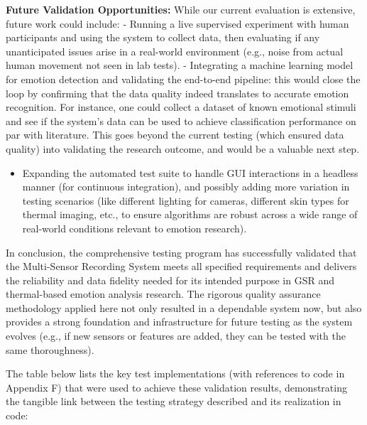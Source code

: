 {{\textbf{Future Validation Opportunities:} While our current evaluation is
extensive, future work could include: - Running a live supervised
experiment with human participants and using the system to collect data,
then evaluating if any unanticipated issues arise in a real-world
environment (e.g., noise from actual human movement not seen in lab
tests). - Integrating a machine learning model for emotion detection and
validating the end-to-end pipeline: this would close the loop by
confirming that the data quality indeed translates to accurate emotion
recognition. For instance, one could collect a dataset of known
emotional stimuli and see if the system's data can be used to achieve
classification performance on par with literature. This goes beyond the
current testing (which ensured data quality) into validating the
research outcome, and would be a valuable next step.

\begin{itemize}
\item Expanding the automated test suite to handle GUI interactions in a
  headless manner (for continuous integration), and possibly adding more
  variation in testing scenarios (like different lighting for cameras,
  different skin types for thermal imaging, etc., to ensure algorithms
  are robust across a wide range of real-world conditions relevant to
  emotion research).

\end{itemize}
In conclusion, the comprehensive testing program has successfully
validated that the Multi-Sensor Recording System meets all specified
requirements and delivers the reliability and data fidelity needed for
its intended purpose in GSR and thermal-based emotion analysis research.
The rigorous quality assurance methodology applied here not only
resulted in a dependable system now, but also provides a strong
foundation and infrastructure for future testing as the system evolves
(e.g., if new sensors or features are added, they can be tested with the
same thoroughness).

The table below lists the key test implementations (with references to
code in Appendix F) that were used to achieve these validation results,
demonstrating the tangible link between the testing strategy described
and its realization in code:

}}
